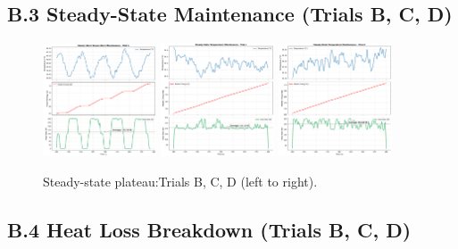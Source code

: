 \documentclass[12pt]{article}
\begin{document}
\subsection*{B.3 Steady-State Maintenance (Trials B, C, D)}

\begin{figure}[H]
\centering
\includegraphics[width=0.30\textwidth]{graphs/part2_trial_b_heater_maintenance.png}\hfill
\includegraphics[width=0.30\textwidth]{graphs/part2_trial_c_heater_maintenance.png}\hfill
\includegraphics[width=0.30\textwidth]{graphs/part2_trial_d_heater_maintenance.png}
\caption{Steady-state plateau:Trials B, C, D (left to right).}
\label{fig:app_maintenance}
\end{figure}

\subsection*{B.4 Heat Loss Breakdown (Trials B, C, D)}
\end{document}

